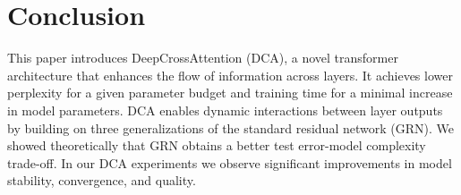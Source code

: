 \section{Conclusion}
\label{sec:conclusion}


This paper introduces DeepCrossAttention (DCA), a novel transformer architecture that enhances the flow of information across layers. It achieves lower perplexity for a given parameter budget and training time for a minimal increase in model parameters.
DCA enables dynamic interactions between layer outputs by building on three generalizations of the standard residual network (GRN). We showed theoretically that GRN obtains a better test error-model complexity trade-off.
In our DCA experiments we observe significant improvements in model stability, convergence, and quality. 